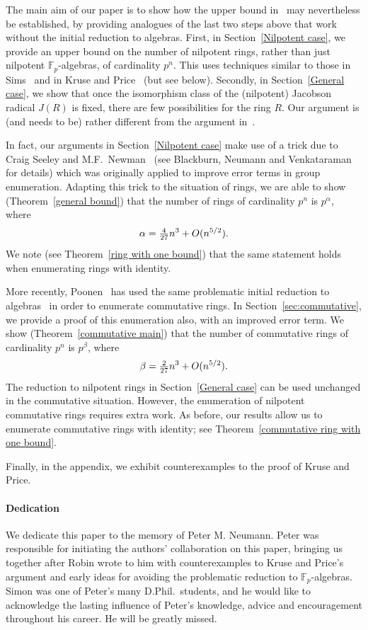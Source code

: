 \documentclass[12pt]{article}
\newcommand{\Oh}{\mathnormal{O}}
\begin{document}
The main aim of our paper is to show how the upper bound in~\cite{K & P} may nevertheless be established, by providing analogues of the last two steps above that work without the initial reduction to algebras. First, in Section~\ref{Nilpotent case}, we provide an upper bound on the number of nilpotent rings, rather than just nilpotent $\mathbb{F}_p$-algebras, of cardinality $p^n$. This uses techniques similar to those in Sims~\cite{Sims} and in Kruse and Price~\cite{K & P} (but see below). Secondly, in Section~\ref{General case}, we show that once the isomorphism class of the (nilpotent) Jacobson radical $J(R)$ is fixed, there are few possibilities for the ring $R$. Our argument is (and needs to be) rather different from the argument in~\cite{K & P}.

In fact, our arguments in Section~\ref{Nilpotent case} make use of a trick due to Craig Seeley and M.F.~Newman~\cite{SeeleyNewman} (see Blackburn, Neumann and Venkataraman~\cite[Chapter~5]{BlackburnNeumann} for details) which was originally applied to improve error terms in group enumeration. Adapting this trick to the situation of rings, we are able to show (Theorem~\ref{general bound}) that the number of rings of cardinality $p^{n}$ is $p^{\alpha}$, where
\[
\alpha = \tfrac{4}{27}n^{3} + \Oh(n^{5/2}).
\]
We note (see Theorem~\ref{ring with one bound}) that the same statement holds when enumerating rings with identity.

More recently, Poonen~\cite[Section~11]{Poonen} has used the same problematic initial reduction to algebras~\cite[Lemma~11.1]{Poonen} in order to enumerate commutative rings. In Section~\ref{sec:commutative}, we provide a proof of this enumeration also, with an improved error term. We show (Theorem~\ref{commutative main}) that the number of commutative rings of cardinality $p^n$ is $p^\beta$, where
\[
\beta= \tfrac{2}{27}n^{3} + \Oh(n^{5/2}).
\]
The reduction to nilpotent rings in Section~\ref{General case} can be used unchanged in the commutative situation. However, the enumeration of nilpotent commutative rings requires extra work. As before, our results allow us to enumerate commutative rings with identity; see Theorem~\ref{commutative ring with one bound}. 

Finally, in the appendix, we exhibit counterexamples to the proof of Kruse and Price.

\paragraph{Dedication} We dedicate this paper to the memory of Peter M. Neumann. Peter was responsible for initiating the authors' collaboration on this paper, bringing us together after Robin wrote to him with counterexamples to Kruse and Price's argument and early ideas for avoiding the problematic reduction to $\mathbb{F}_p$-algebras. Simon was one of Peter's many D.Phil.\  students, and he would like to acknowledge the lasting influence of Peter's knowledge, advice and encouragement throughout his career. He will be greatly missed.
\end{document}
